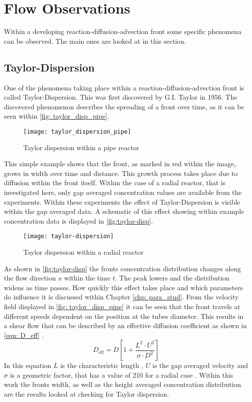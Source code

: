 \documentclass[../thesis.tex]{subfiles}
\begin{document}
\section{Flow Observations}

Within a developing reaction-diffusion-advection front some specific phenomena can be observed. The main ones are looked at in this section.

\subsection{Taylor-Dispersion}

One of the phenomena taking place within a reaction-diffusion-advection front is called Taylor-Dispersion. This was first discovered by G.I. Taylor\cite{aris1956dispersion} in 1956. The discovered phenomenon describes the spreading of a front over time, as it can be seen within \autoref{fig: taylor_disp_pipe}. 
\begin{figure}[htbp]
	\centering
	\texttt{[image: taylor\_dispersion\_pipe]}
	\caption{Taylor dispersion within a pipe reactor}
	\label{fig: taylor_disp_pipe}
\end{figure}
This simple example shows that the front, as marked in red within the image, grows in width over time and distance. This growth process takes place due to diffusion within the front itself. Within the case of a radial reactor, that is investigated here, only gap averaged concentration values are available from the experiments. Within these experiments the effect of Taylor-Dispersion is visible within the gap averaged data. A schematic \cite{levenspiel1998chemical} of this effect showing within example concentration data is displayed in \autoref{fig:taylor-disp}.
\begin{figure}[htbp]
	\centering
	\texttt{[image: taylor-dispersion]}
	\caption{Taylor dispersion within a radial reactor \cite{levenspiel1998chemical}}
	\label{fig:taylor-disp}
\end{figure}

As shown in \autoref{fig:taylor-disp} the fronts concentration distribution changes along the flow direction $x$ within the time $t$. The peak lowers and the distribution widens as time passes. How quickly this effect takes place and which parameters do influence it is discussed within Chapter \ref{chp: para_stud}. From the velocity field displayed in \autoref{fig: taylor_disp_pipe} it can be seen that the front travels at different speeds dependent on the position at the tubes diameter. This results in a shear flow that can be described by an effective diffusion coefficient as shown in \autoref{eqn: D_eff} \cite{toth2020effects}.
\begin{equation}
	\label{eqn: D_eff}
	D_{\text{eff}} = D \left[
		1 + \dfrac{L^2 \cdot U^2}{\sigma \cdot D^2}
	\right]
\end{equation}
In this equation $L$ is the characteristic length , $U$ is the gap averaged velocity and $\sigma$ is a geometric factor, that has a value of 210 for a radial case \cite{toth2020effects}.
Within this work the fronts width, as well as the height averaged concentration distribution are the results looked at checking for Taylor dispersion.
\end{document}
